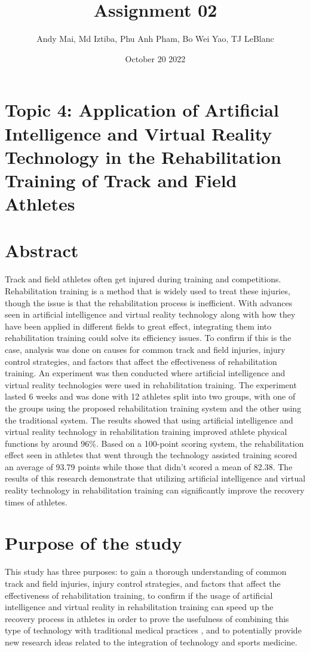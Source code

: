 \documentclass{article}
\title{Assignment 02}
\author{Andy Mai, Md Iztiba, Phu Anh Pham, Bo Wei Yao, TJ LeBlanc}
\date{October 20 2022}
\begin{document}
\maketitle

\section*{Topic 4: Application of Artificial Intelligence and Virtual Reality Technology in the Rehabilitation Training of Track and Field Athletes}

\section*{Abstract}
Track and field athletes often get injured during training and competitions. Rehabilitation training is a method that is widely used to treat these injuries, though the issue is that the rehabilitation process is inefficient. With advances seen in artificial intelligence and virtual reality technology along with how they have been applied in different fields to great effect, integrating them into rehabilitation training could solve its efficiency issues. To confirm if this is the case, analysis was done on causes for common track and field injuries, injury control strategies, and factors that affect the effectiveness of rehabilitation training. An experiment was then conducted where artificial intelligence and virtual reality technologies were used in rehabilitation training. The experiment lasted 6 weeks and was done with 12 athletes split into two groups, with one of the groups using the proposed rehabilitation training system and the other using the traditional system. The results showed that using artificial intelligence and virtual reality technology in rehabilitation training improved athlete physical functions by around 96\%. Based on a 100-point scoring system, the rehabilitation effect seen in athletes that went through the technology assisted training scored an average of 93.79 points while those that didn’t scored a mean of 82.38. The results of this research demonstrate that utilizing artificial intelligence and virtual reality technology in rehabilitation training can significantly improve the recovery times of athletes.
\section*{Purpose of the study}
This study has three purposes: to gain a thorough understanding of common track and field injuries, injury control strategies, and factors that affect the effectiveness of rehabilitation training, to confirm if the usage of artificial intelligence and virtual reality in rehabilitation training can speed up the recovery process in athletes in order to prove the usefulness of combining this type of technology with traditional medical practices \cite{Lai2018}, and to potentially provide new research ideas related to the integration of technology and sports medicine.
\end{document}
